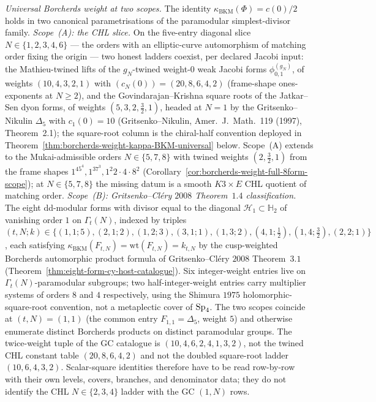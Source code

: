 \emph{Universal Borcherds weight at two scopes.} The identity
$\kappa_{\mathrm{BKM}}(\Phi) = c(0)/2$ holds in two canonical
parametrisations of the paramodular simplest-divisor family.
\emph{Scope~(A): the CHL slice.} On the five-entry
diagonal slice $N \in \{1, 2, 3, 4, 6\}$ --- the orders with an
elliptic-curve automorphism of matching order fixing the origin ---
two honest ladders coexist, per declared Jacobi input: the
Mathieu-twined lifts of the $g_N$-twined weight-$0$ weak Jacobi forms
$\phi_{0, 1}^{(g_N)}$, of weights $(10, 4, 3, 2, 1)$ with
$(c_N(0)) = (20, 8, 6, 4, 2)$ (frame-shape ones-exponents at
$N \geq 2$), and the Govindarajan--Krishna square roots of the
Jatkar--Sen dyon forms, of weights $(5, 3, 2, \tfrac32, 1)$, headed
at $N = 1$ by the Gritsenko--Nikulin $\Delta_5$ with $c_1(0) = 10$
(Gritsenko--Nikulin, Amer.~J.~Math.~119 (1997), Theorem~2.1); the
square-root column is the chiral-half convention deployed in
Theorem~\ref{thm:borcherds-weight-kappa-BKM-universal} below.
Scope~(A) extends to the Mukai-admissible orders $N \in \{5, 7, 8\}$
with twined weights $(2, \tfrac32, 1)$ from the frame shapes
$1^45^4, 1^37^3, 1^2 2\cdot4\cdot8^2$
(Corollary~\ref{cor:borcherds-weight-full-8form-scope});
at \(N\in\{5,7,8\}\) the missing datum is a smooth \(K3\times E\) CHL
quotient of matching order.
\emph{Scope~(B): Gritsenko--Cl\'ery $2008$ Theorem~$1.4$ classification.}
The eight dd-modular forms with divisor equal to the diagonal
$\mathcal{H}_1 \subset \mathbb{H}_2$ of vanishing order $1$ on
$\Gamma_t(N)$, indexed by triples $(t, N; k) \in \bigl\{(1, 1; 5),
(2, 1; 2), (1, 2; 3), (3, 1; 1), (1, 3; 2), (4, 1; \tfrac{1}{2}),
(1, 4; \tfrac{3}{2}), (2, 2; 1)\bigr\}$, each satisfying
$\kappa_{\mathrm{BKM}}(F_{t, N}) = \mathrm{wt}(F_{t, N}) = k_{t, N}$
by the cusp-weighted Borcherds automorphic product formula of
Gritsenko--Cl\'ery $2008$ Theorem~$3.1$ (Theorem~\ref{thm:eight-form-cy-host-catalogue}).
Six integer-weight entries live on $\Gamma_t(N)$-paramodular
subgroups; two half-integer-weight entries carry multiplier systems of
orders $8$ and $4$ respectively, using the Shimura $1975$ holomorphic-
square-root convention, not a metaplectic cover of $\mathrm{Sp}_4$. The two
scopes coincide at $(t, N) = (1, 1)$ (the common entry
$F_{1, 1} = \Delta_5$, weight $5$) and otherwise enumerate distinct
Borcherds products on distinct paramodular groups. The twice-weight tuple
of the GC catalogue is $(10,4,6,2,4,1,3,2)$, not the twined CHL constant
table $(20,8,6,4,2)$ and not the doubled square-root ladder
$(10,6,4,3,2)$. Scalar-square identities therefore have to be read
row-by-row with their own levels, covers, branches, and denominator data;
they do not identify the CHL $N \in \{2,3,4\}$ ladder with the GC
$(1,N)$ rows.

